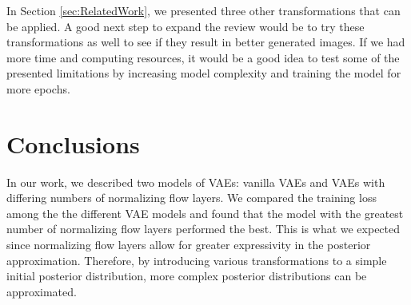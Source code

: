 \documentclass{article}
\begin{document}
In Section \ref{sec:RelatedWork}, we presented three other transformations that can be applied. 
A good next step to expand the review would be to try these transformations as well to see if they 
result in better generated images. If we had more time and computing resources, it would be a good 
idea to test some of the presented limitations by increasing model complexity and training the model 
for more epochs.

\section{Conclusions}
In our work, we described two models of VAEs: vanilla VAEs and VAEs with differing numbers of
normalizing flow layers.  We compared the training loss among the the different VAE models and found
that the model with the greatest number of normalizing flow layers performed the best.  This is what we
expected since normalizing flow layers allow for greater expressivity in the posterior approximation.
Therefore, by introducing various transformations to a simple initial posterior distribution, more complex
posterior distributions can be approximated.


\small
%


\end{document}
